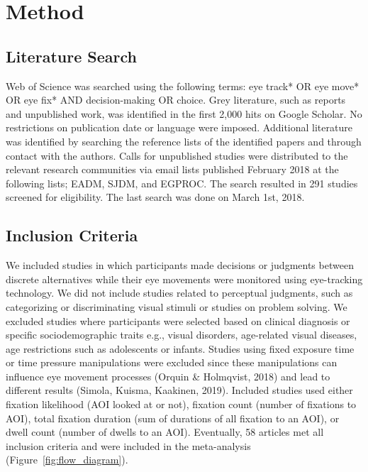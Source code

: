 \documentclass{article}
\begin{document}

\section{Method}

\subsection{Literature Search}

Web of Science was searched using the following terms: eye track* OR eye move* OR eye fix* AND decision-making OR choice. Grey literature, such as reports and unpublished work, was identified in the first 2,000 hits on Google Scholar. No restrictions on publication date or language were imposed. Additional literature was identified by searching the reference lists of the identified papers and through contact with the authors. Calls for unpublished studies were distributed to the relevant research communities via email lists published February 2018 at the following lists; EADM, SJDM, and EGPROC. The search resulted in 291 studies screened for eligibility. The last search was done on March 1st, 2018.


\subsection{Inclusion Criteria}

We included studies in which participants made decisions or judgments between discrete alternatives while their eye movements were monitored using eye-tracking technology. We did not include studies related to perceptual judgments, such as categorizing or discriminating visual stimuli or studies on problem solving. We excluded studies where participants were selected based on clinical diagnosis or specific sociodemographic traits e.g., visual disorders, age-related visual diseases, age restrictions such as adolescents or infants. Studies using fixed exposure time or time pressure manipulations were excluded since these manipulations can influence eye movement processes (Orquin \& Holmqvist, 2018) and lead to different results (Simola, Kuisma, Kaakinen, 2019). Included studies used either fixation likelihood (AOI looked at or not), fixation count (number of fixations to AOI), total fixation duration (sum of durations of all fixation to an AOI), or dwell count (number of dwells to an AOI). Eventually, 58 articles met all inclusion criteria and were included in the meta-analysis (Figure~\ref{fig:flow_diagram}).
\end{document}
